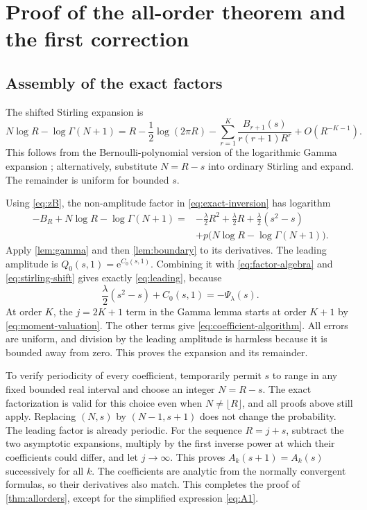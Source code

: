 \documentclass[11pt,a4paper]{article}
\numberwithin{equation}{section}
\theoremstyle{definition}
\newcommand{\ee}{\mathrm e}
\begin{document}
\section{Proof of the all-order theorem and the first correction}
\label{sec:proof-main}

\subsection{Assembly of the exact factors}
The shifted Stirling expansion is
\begin{equation}
 N\log R-\log\Gamma(N+1)
 =R-\frac12\log(2\pi R)
 -\sum_{r=1}^K\frac{B_{r+1}(s)}{r(r+1)R^r}
 +O(R^{-K-1}).
 \label{eq:stirling-shift}
\end{equation}
This follows from the Bernoulli-polynomial version of the logarithmic Gamma expansion \cite[\S5.11]{dlmf}; alternatively, substitute $N=R-s$ into ordinary Stirling and expand. The remainder is uniform for bounded $s$.

Using \eqref{eq:zB}, the non-amplitude factor in \eqref{eq:exact-inversion} has logarithm
\begin{equation}
\begin{split}
 -B_R+N\log R-\log\Gamma(N+1)
 ={}&-\frac\lambda2R^2+\frac\lambda2R
       +\frac\lambda2(s^2-s)\\
 &+p\bigl(N\log R-\log\Gamma(N+1)\bigr).
\end{split}
\label{eq:factor-algebra}
\end{equation}
Apply \cref{lem:gamma} and then \cref{lem:boundary} to its derivatives. The leading amplitude is $Q_0(s,1)=\ee^{C_0(s,1)}$. Combining it with \eqref{eq:factor-algebra} and \eqref{eq:stirling-shift} gives exactly \eqref{eq:leading}, because
\[
 \frac\lambda2(s^2-s)+C_0(s,1)=-\Psi_\lambda(s).
\]
At order $K$, the $j=2K+1$ term in the Gamma lemma starts at order $K+1$ by \eqref{eq:moment-valuation}. The other terms give \eqref{eq:coefficient-algorithm}. All errors are uniform, and division by the leading amplitude is harmless because it is bounded away from zero. This proves the expansion and its remainder.

To verify periodicity of every coefficient, temporarily permit $s$ to range in any fixed bounded real interval and choose an integer $N=R-s$. The exact factorization is valid for this choice even when $N\ne\lfloor R\rfloor$, and all proofs above still apply. Replacing $(N,s)$ by $(N-1,s+1)$ does not change the probability. The leading factor is already periodic. For the sequence $R=j+s$, subtract the two asymptotic expansions, multiply by the first inverse power at which their coefficients could differ, and let $j\to\infty$. This proves $A_k(s+1)=A_k(s)$ successively for all $k$. The coefficients are analytic from the normally convergent formulas, so their derivatives also match. This completes the proof of \cref{thm:allorders}, except for the simplified expression \eqref{eq:A1}.
\end{document}
